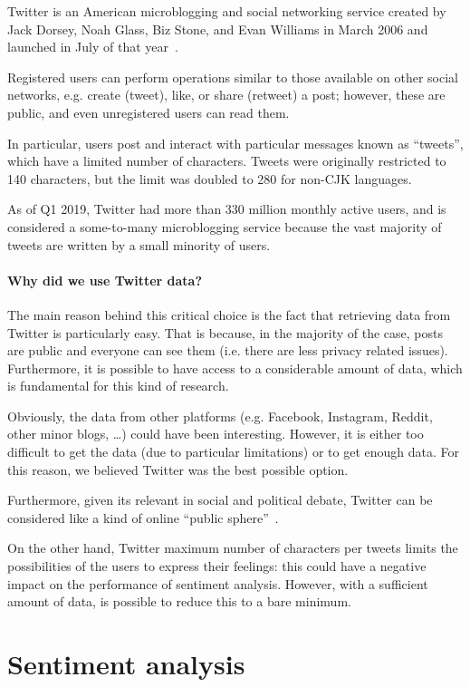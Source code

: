 Twitter is an American microblogging and social networking service created by Jack Dorsey, Noah Glass, Biz Stone, and Evan Williams in March 2006 and launched in July of that year~\cite{enwiki:1027840990}.

Registered users can perform operations similar to those available on other social networks, e.g. create (tweet), like, or share (retweet) a post; however, these are public, and even unregistered users can read them. 

In particular, users post and interact with particular messages known as “tweets”, which have a limited number of characters. Tweets were originally restricted to 140 characters, but the limit was doubled to 280 for non-CJK languages.

As of Q1 2019, Twitter had more than 330 million monthly active users, and is considered a some-to-many microblogging service because the vast majority of tweets are written by a small minority of users.

\paragraph{Why did we use Twitter data?}

The main reason behind this critical choice is the fact that retrieving data from Twitter is particularly easy. That is because, in the majority of the case, posts are public and everyone can see them (i.e. there are less privacy related issues). Furthermore, it is possible to have access to a considerable amount of data, which is fundamental for this kind of research. 

Obviously, the data from other platforms (e.g. Facebook, Instagram, Reddit, other minor blogs, \ldots) could have been interesting. However, it is either too difficult to get the data (due to particular limitations) or to get enough data. For this reason, we believed Twitter was the best possible option.

Furthermore, given its relevant in social and political debate, Twitter can be considered like a kind of online “public sphere”~\cite{doi:10.1080/1369118X.2012.756050}.

On the other hand, Twitter maximum number of characters per tweets limits the possibilities of the users to express their feelings: this could have a negative impact on the performance of sentiment analysis. However, with a sufficient amount of data, is possible to reduce this to a bare minimum. 

\section{Sentiment analysis}
\label{sec:sentiment-analysis}

